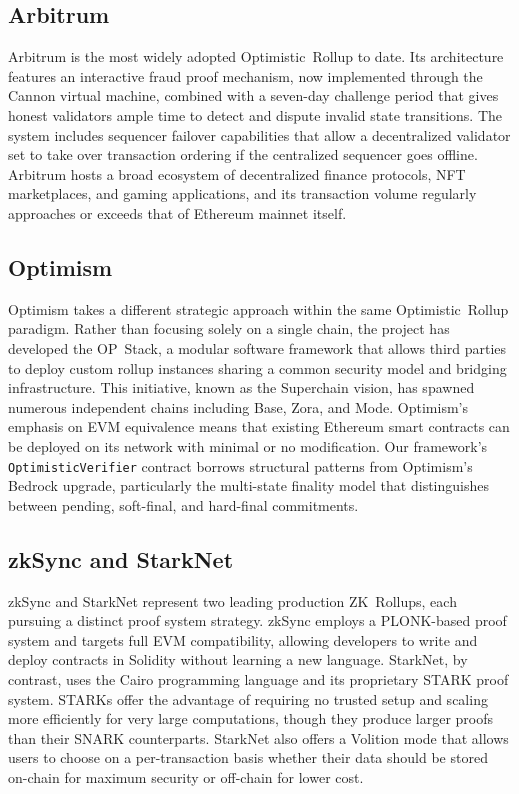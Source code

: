 \documentclass[
]{elteikthesis}[2024/04/26]
\begin{document}
\subsection{Arbitrum}

Arbitrum is the most widely adopted Optimistic~Rollup to date. Its architecture features an interactive fraud proof mechanism, now implemented through the Cannon virtual machine, combined with a seven-day challenge period that gives honest validators ample time to detect and dispute invalid state transitions. The system includes sequencer failover capabilities that allow a decentralized validator set to take over transaction ordering if the centralized sequencer goes offline. Arbitrum hosts a broad ecosystem of decentralized finance protocols, NFT marketplaces, and gaming applications, and its transaction volume regularly approaches or exceeds that of Ethereum mainnet itself.

\subsection{Optimism}

Optimism takes a different strategic approach within the same Optimistic~Rollup paradigm. Rather than focusing solely on a single chain, the project has developed the OP~Stack, a modular software framework that allows third parties to deploy custom rollup instances sharing a common security model and bridging infrastructure. This initiative, known as the Superchain vision, has spawned numerous independent chains including Base, Zora, and Mode. Optimism's emphasis on EVM equivalence means that existing Ethereum smart contracts can be deployed on its network with minimal or no modification. Our framework's \texttt{OptimisticVerifier} contract borrows structural patterns from Optimism's Bedrock upgrade, particularly the multi-state finality model that distinguishes between pending, soft-final, and hard-final commitments.

\subsection{zkSync and StarkNet}

zkSync and StarkNet represent two leading production ZK~Rollups, each pursuing a distinct proof system strategy. zkSync employs a PLONK-based proof system and targets full EVM compatibility, allowing developers to write and deploy contracts in Solidity without learning a new language. StarkNet, by contrast, uses the Cairo programming language and its proprietary STARK proof system. STARKs offer the advantage of requiring no trusted setup and scaling more efficiently for very large computations, though they produce larger proofs than their SNARK counterparts. StarkNet also offers a Volition mode that allows users to choose on a per-transaction basis whether their data should be stored on-chain for maximum security or off-chain for lower cost.
\end{document}
